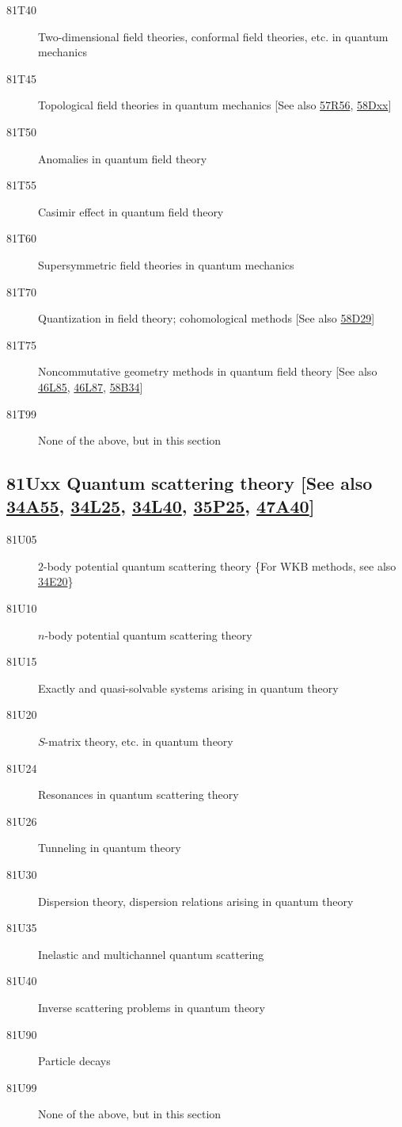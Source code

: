 \documentclass[letterpaper]{article}
\begin{document}
\begin{description}
\item [81T40]\label{81T40} Two-dimensional field theories, conformal field theories, etc. in quantum mechanics
\item [81T45]\label{81T45} Topological field theories in quantum mechanics [See also \hyperref[57R56]{57R56}, \hyperref[58Dxx]{58Dxx}]
\item [81T50]\label{81T50} Anomalies in quantum field theory
\item [81T55]\label{81T55} Casimir effect in quantum field theory
\item [81T60]\label{81T60} Supersymmetric field theories in quantum mechanics
\item [81T70]\label{81T70} Quantization in field theory; cohomological methods [See also \hyperref[58D29]{58D29}]
\item [81T75]\label{81T75} Noncommutative geometry methods in quantum field theory [See also \hyperref[46L85]{46L85}, \hyperref[46L87]{46L87}, \hyperref[58B34]{58B34}]
\item [81T99]\label{81T99} None of the above, but in this section
\end{description}
\subsection*{81Uxx  Quantum scattering theory [See also \hyperref[34A55]{34A55}, \hyperref[34L25]{34L25}, \hyperref[34L40]{34L40}, \hyperref[35P25]{35P25}, \hyperref[47A40]{47A40}] }\label{81Uxx}
\begin{description}  
\item [81U05]\label{81U05} $2$-body potential quantum scattering theory \{For WKB methods, see also \hyperref[34E20]{34E20}\}
\item [81U10]\label{81U10} $n$-body potential quantum scattering theory
\item [81U15]\label{81U15} Exactly and quasi-solvable systems arising in quantum theory
\item [81U20]\label{81U20} $S$-matrix theory, etc. in quantum theory
\item [81U24]\label{81U24} Resonances in quantum scattering theory
\item [81U26]\label{81U26} Tunneling in quantum theory
\item [81U30]\label{81U30} Dispersion theory, dispersion relations arising in quantum theory
\item [81U35]\label{81U35} Inelastic and multichannel quantum scattering
\item [81U40]\label{81U40} Inverse scattering problems in quantum theory
\item [81U90]\label{81U90} Particle decays
\item [81U99]\label{81U99} None of the above, but in this section
\end{description}
\end{document}
